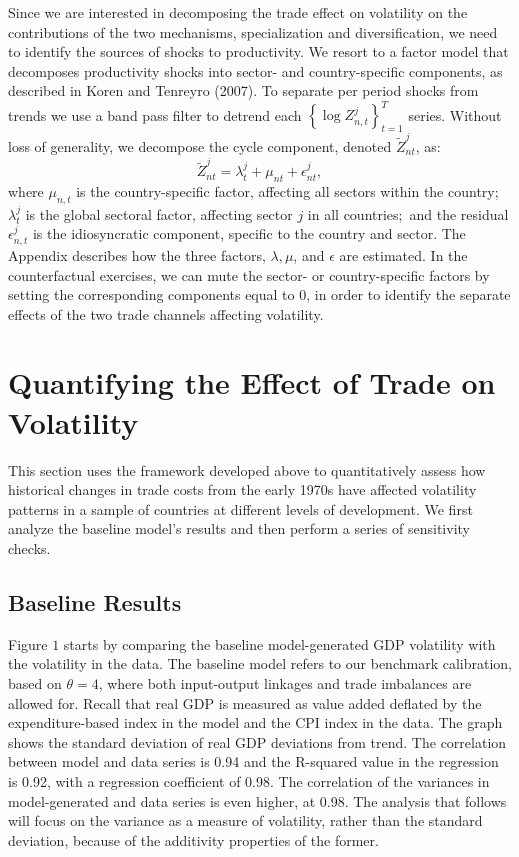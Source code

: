 \documentclass[12pt]{article}
\begin{document}
Since we are interested in decomposing the trade effect on volatility on the
contributions of the two mechanisms, specialization and diversification, we
need to identify the sources of shocks to productivity. We resort to a
factor model that decomposes productivity shocks into sector- and
country-specific components, as described in Koren and Tenreyro (2007). To
separate per period shocks from trends we use a band pass filter to detrend
each $\left\{ \log {Z_{n,t}^{j}}\right\} _{t=1}^{T}$ series. Without loss of
generality, we decompose the cycle component, denoted $\tilde{Z}_{nt}^{j}$,
as: 
\begin{equation*}
\tilde{Z}_{nt}^{j}=\lambda _{t}^{j}+\mu _{nt}+\epsilon _{nt}^{j},
\end{equation*}%
where ${\mu _{n,t}}$ is the country-specific factor, affecting all sectors
within the country; $\lambda _{t}^{j}$ is the global sectoral factor,
affecting sector $j$ in all countries;\ and the residual $\epsilon _{n,t}^{j}
$ is the idiosyncratic component, specific to the country and sector. The
Appendix describes how the three factors, $\lambda ,\mu $, and $\epsilon $
are estimated. In the counterfactual exercises, we can mute the sector- or
country-specific factors by setting the corresponding components equal to 0,
in order to identify the separate effects of the two trade channels
affecting volatility.

\section{Quantifying the Effect of Trade on Volatility}

This section uses the framework developed above to quantitatively assess how
historical changes in trade costs from the early 1970s have affected
volatility patterns in a sample of countries at different levels of
development. We first analyze the baseline model's results and then perform
a series of sensitivity checks.

\subsection{Baseline Results}

Figure $1$ starts by comparing the baseline model-generated GDP volatility
with the volatility in the data. The baseline model refers to our benchmark
calibration, based on $\theta =4$, where both input-output linkages and
trade imbalances are allowed for. Recall that real GDP is measured as value
added deflated by the expenditure-based index in the model and the CPI index
in the data. The graph shows the standard deviation of real GDP deviations
from trend. The correlation between model and data series is 0.94 and the
R-squared value in the regression is 0.92, with a regression coefficient of
0.98. The correlation of the variances in model-generated and data series is
even higher, at 0.98. The analysis that follows will focus on the variance
as a measure of volatility, rather than the standard deviation, because of
the additivity properties of the former.
\end{document}
